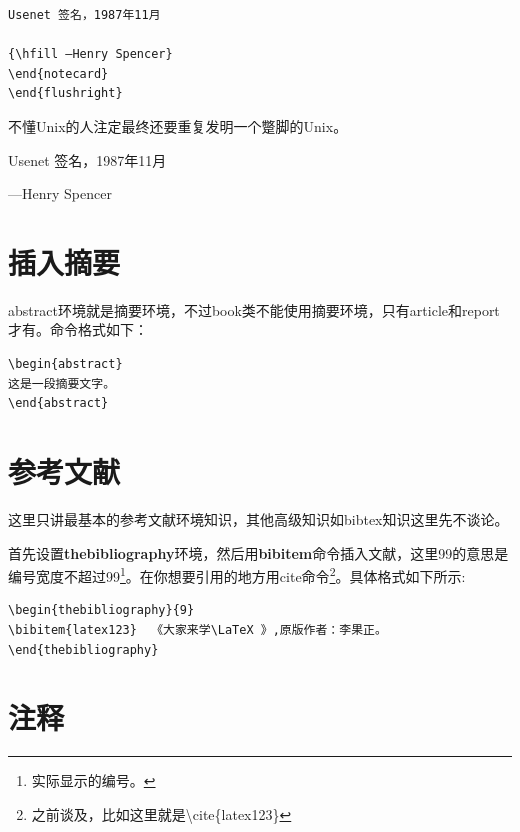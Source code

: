 \documentclass[12pt,oneside]{book}
\begin{document}
\begin{common-format}
\begin{Verbatim}
Usenet 签名，1987年11月

{\hfill —Henry Spencer}
\end{notecard}
\end{flushright}
\end{Verbatim}

\begin{flushright}
\begin{notecard}[blue!30]{14em}
不懂Unix的人注定最终还要重复发明一个蹩脚的Unix。

Usenet 签名，1987年11月

{\hfill —Henry Spencer}
\end{notecard}
\end{flushright}



\section{插入摘要}
abstract环境就是摘要环境，不过book类不能使用摘要环境，只有article和report才有。命令格式如下：
\begin{Verbatim}
\begin{abstract}
这是一段摘要文字。
\end{abstract}
\end{Verbatim}



\section{参考文献}
这里只讲最基本的参考文献环境知识，其他高级知识如bibtex知识这里先不谈论。

首先设置\textbf{thebibliography}环境，然后用\textbf{bibitem}命令插入文献，这里99的意思是编号宽度不超过99\footnote{实际显示的编号。}。在你想要引用的地方用cite命令\footnote{之前谈及，比如这里就是\textbackslash cite\{latex123\}}。具体格式如下所示:

\begin{Verbatim}
\begin{thebibliography}{9}
\bibitem{latex123}  《大家来学\LaTeX 》,原版作者：李果正。
\end{thebibliography}
\end{Verbatim}




\section{注释}
\showendnotes









\end{common-format}
\end{document}
